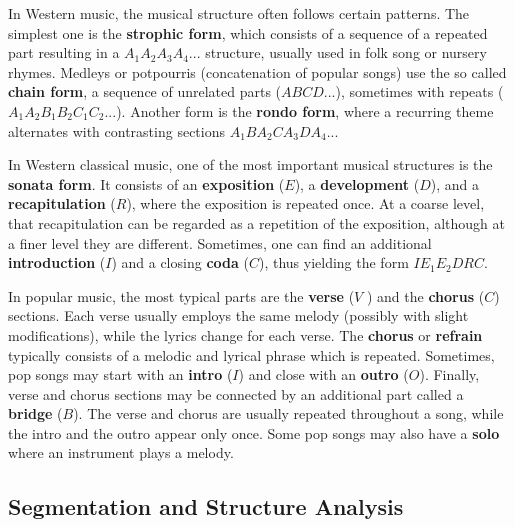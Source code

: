 \documentclass[a4paper, 9pt, twocolumn]{extarticle}
\begin{document}
\medskip

In Western music, the musical structure often follows certain patterns. The simplest one is the \textbf{strophic form}, which consists of a sequence of a repeated part resulting in a $A_{1}A_{2}A_{3}A_{4}...$ structure, usually used in folk song or nursery rhymes. Medleys or potpourris (concatenation of popular songs) use the so called \textbf{chain form}, a sequence of unrelated parts ($ABCD...$), sometimes with repeats ($A_{1}A_{2}B_{1}B_{2}C_{1}C_{2}...$). Another form is the \textbf{rondo form}, where a recurring theme alternates with contrasting sections $A_{1}BA_{2}CA_{3}DA_{4}...$

\medskip

In Western classical music, one of the most important musical structures is the \textbf{sonata form}. It consists of an \textbf{exposition} ($E$), a \textbf{development} ($D$), and a \textbf{recapitulation} ($R$), where the exposition is repeated once. At a coarse level, that recapitulation can be regarded as a repetition of the exposition, although at a finer level they are different. Sometimes, one can find an additional \textbf{introduction} ($I$) and a closing \textbf{coda} ($C$), thus yielding the form $ IE_{1} E_{2} DRC $. 

\medskip

In popular music, the most typical parts are the \textbf{verse} ($V$ ) and the \textbf{chorus} ($C$)
sections. Each verse usually employs the same melody (possibly with slight modifications), while the lyrics change for each verse. The \textbf{chorus} or \textbf{refrain} typically consists of a melodic and lyrical phrase which is repeated. Sometimes, pop songs may start with an \textbf{intro} ($I$) and close with an \textbf{outro} ($O$). Finally, verse and chorus sections may be connected by an additional part called a \textbf{bridge} ($B$). The verse and chorus are usually repeated throughout a song, while the intro and the outro appear only once. Some pop songs may also have a \textbf{solo} where an instrument plays a melody. 


\subsection{Segmentation and Structure Analysis}

\end{document}
